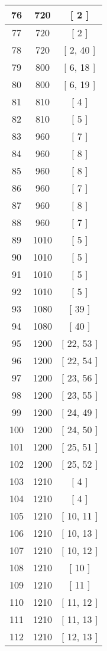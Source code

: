 \begin{center}
\begin{longtable}[H]{|| c c c ||}
\\\hline
76 & 720 & [ 2 ]
\\\hline
77 & 720 & [ 2 ]
\\\hline
78 & 720 & [ 2, 40 ]
\\\hline
79 & 800 & [ 6, 18 ]
\\\hline
80 & 800 & [ 6, 19 ]
\\\hline
81 & 810 & [ 4 ]
\\\hline
82 & 810 & [ 5 ]
\\\hline
83 & 960 & [ 7 ]
\\\hline
84 & 960 & [ 8 ]
\\\hline
85 & 960 & [ 8 ]
\\\hline
86 & 960 & [ 7 ]
\\\hline
87 & 960 & [ 8 ]
\\\hline
88 & 960 & [ 7 ]
\\\hline
89 & 1010 & [ 5 ]
\\\hline
90 & 1010 & [ 5 ]
\\\hline
91 & 1010 & [ 5 ]
\\\hline
92 & 1010 & [ 5 ]
\\\hline
93 & 1080 & [ 39 ]
\\\hline
94 & 1080 & [ 40 ]
\\\hline
95 & 1200 & [ 22, 53 ]
\\\hline
96 & 1200 & [ 22, 54 ]
\\\hline
97 & 1200 & [ 23, 56 ]
\\\hline
98 & 1200 & [ 23, 55 ]
\\\hline
99 & 1200 & [ 24, 49 ]
\\\hline
100 & 1200 & [ 24, 50 ]
\\\hline
101 & 1200 & [ 25, 51 ]
\\\hline
102 & 1200 & [ 25, 52 ]
\\\hline
103 & 1210 & [ 4 ]
\\\hline
104 & 1210 & [ 4 ]
\\\hline
105 & 1210 & [ 10, 11 ]
\\\hline
106 & 1210 & [ 10, 13 ]
\\\hline
107 & 1210 & [ 10, 12 ]
\\\hline
108 & 1210 & [ 10 ]
\\\hline
109 & 1210 & [ 11 ]
\\\hline
110 & 1210 & [ 11, 12 ]
\\\hline
111 & 1210 & [ 11, 13 ]
\\\hline
112 & 1210 & [ 12, 13 ]
\\\hline

\end{longtable}
\end{center}
